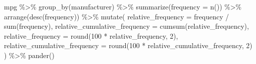 \documentclass[]{tufte-book}
\newenvironment{Shaded}{}{}
\newcommand{\AttributeTok}[1]{\textcolor[rgb]{0.49,0.56,0.16}{#1}}
\newcommand{\DecValTok}[1]{\textcolor[rgb]{0.25,0.63,0.44}{#1}}
\newcommand{\FunctionTok}[1]{\textcolor[rgb]{0.02,0.16,0.49}{#1}}
\newcommand{\NormalTok}[1]{#1}
\newcommand{\SpecialCharTok}[1]{\textcolor[rgb]{0.25,0.44,0.63}{#1}}
\begin{document}
\begin{Shaded}
\begin{Highlighting}[]
\NormalTok{mpg }\SpecialCharTok{\%\textgreater{}\%}
  \FunctionTok{group\_by}\NormalTok{(manufacturer) }\SpecialCharTok{\%\textgreater{}\%}
  \FunctionTok{summarize}\NormalTok{(}\AttributeTok{frequency =} \FunctionTok{n}\NormalTok{()) }\SpecialCharTok{\%\textgreater{}\%}
  \FunctionTok{arrange}\NormalTok{(}\FunctionTok{desc}\NormalTok{(frequency)) }\SpecialCharTok{\%\textgreater{}\%}
  \FunctionTok{mutate}\NormalTok{(}
    \AttributeTok{relative\_frequency =}\NormalTok{ frequency }\SpecialCharTok{/} \FunctionTok{sum}\NormalTok{(frequency),}
    \AttributeTok{relative\_cumulative\_frequency =} \FunctionTok{cumsum}\NormalTok{(relative\_frequency),}
    \AttributeTok{relative\_frequency =} \FunctionTok{round}\NormalTok{(}\DecValTok{100} \SpecialCharTok{*}\NormalTok{ relative\_frequency, }\DecValTok{2}\NormalTok{),}
    \AttributeTok{relative\_cumulative\_frequency =} \FunctionTok{round}\NormalTok{(}\DecValTok{100} \SpecialCharTok{*}\NormalTok{ relative\_cumulative\_frequency, }\DecValTok{2}\NormalTok{)}
\NormalTok{  ) }\SpecialCharTok{\%\textgreater{}\%}
  \FunctionTok{pander}\NormalTok{()}
\end{Highlighting}
\end{Shaded}
\end{document}
